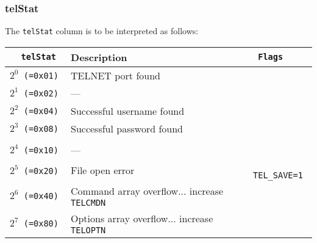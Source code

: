 \documentclass[documentation]{subfiles}
\begin{document}
\subsubsection{telStat}\label{telStat}
The {\tt telStat} column is to be interpreted as follows:
\begin{longtable}{>{\tt}rl>{\tt\small}l}
    \toprule
    {\bf telStat} & {\bf Description}                                & {\bf Flags}\\
    \midrule\endhead%
    $2^0$ (=0x01) & TELNET port found                                & \\
    $2^1$ (=0x02) & ---                                              & \\
    $2^2$ (=0x04) & Successful username found                        & \\
    $2^3$ (=0x08) & Successful password found                        & \\
    \\
    $2^4$ (=0x10) & ---                                              & \\
    $2^5$ (=0x20) & File open error                                  & TEL\_SAVE=1\\
    $2^6$ (=0x40) & Command array overflow... increase {\tt TELCMDN} & \\
    $2^7$ (=0x80) & Options array overflow... increase {\tt TELOPTN} & \\
    \bottomrule
\end{longtable}
\end{document}

